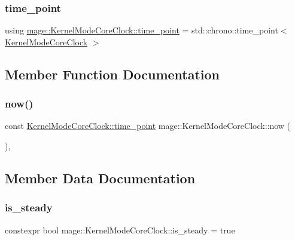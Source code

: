 \hypertarget{structmage_1_1_kernel_mode_core_clock_aca87172eb6e806a46d8792ca8239d2fe}{}\label{structmage_1_1_kernel_mode_core_clock_aca87172eb6e806a46d8792ca8239d2fe} 
\subsubsection{\texorpdfstring{time\+\_\+point}{time\_point}}
{\footnotesize\ttfamily using \hyperlink{structmage_1_1_kernel_mode_core_clock_aca87172eb6e806a46d8792ca8239d2fe}{mage\+::\+Kernel\+Mode\+Core\+Clock\+::time\+\_\+point} =  std\+::chrono\+::time\+\_\+point$<$ \hyperlink{structmage_1_1_kernel_mode_core_clock}{Kernel\+Mode\+Core\+Clock} $>$}



\subsection{Member Function Documentation}
\hypertarget{structmage_1_1_kernel_mode_core_clock_aeef38f3b359f8d4cc1bca3ccb96c9a40}{}\label{structmage_1_1_kernel_mode_core_clock_aeef38f3b359f8d4cc1bca3ccb96c9a40} 
\subsubsection{\texorpdfstring{now()}{now()}}
{\footnotesize\ttfamily const \hyperlink{structmage_1_1_kernel_mode_core_clock_aca87172eb6e806a46d8792ca8239d2fe}{Kernel\+Mode\+Core\+Clock\+::time\+\_\+point} mage\+::\+Kernel\+Mode\+Core\+Clock\+::now (\begin{DoxyParamCaption}{ }\end{DoxyParamCaption})\hspace{0.3cm}{\ttfamily [static]}, {\ttfamily [noexcept]}}



\subsection{Member Data Documentation}
\hypertarget{structmage_1_1_kernel_mode_core_clock_a9b1fe608c5b68bfbe0dc07fefcd5a227}{}\label{structmage_1_1_kernel_mode_core_clock_a9b1fe608c5b68bfbe0dc07fefcd5a227} 
\subsubsection{\texorpdfstring{is\+\_\+steady}{is\_steady}}
{\footnotesize\ttfamily constexpr bool mage\+::\+Kernel\+Mode\+Core\+Clock\+::is\+\_\+steady = true\hspace{0.3cm}{\ttfamily [static]}}


